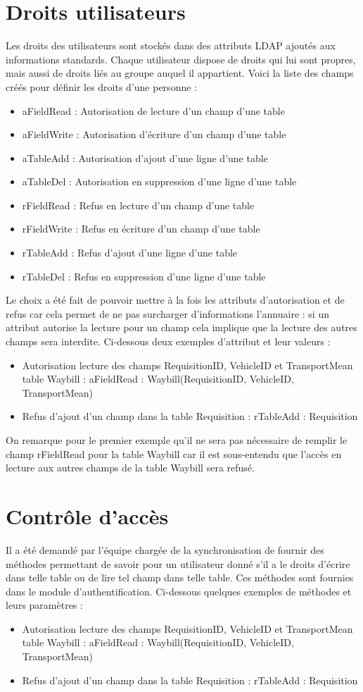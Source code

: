 \documentclass[11pt,fleqn]{report}
\begin{document}
\chapter{Droits utilisateurs}
Les droits des utilisateurs sont stockés dans des attributs LDAP ajoutés aux informations standards. Chaque utilisateur dispose de droits qui lui sont propres, mais aussi de droits liés au groupe auquel il appartient.
Voici la liste des champs créés pour définir les droits d’une personne :
\begin{itemize}
\item aFieldRead : Autorisation de lecture d’un champ d’une table
\item aFieldWrite : Autorisation d’écriture d’un champ d’une table
\item aTableAdd : Autorisation d’ajout d’une ligne d’une table
\item aTableDel : Autorisation en suppression d’une ligne d’une table
\item rFieldRead : Refus en lecture d’un champ d’une table
\item rFieldWrite : Refus en écriture d’un champ d’une table
\item rTableAdd : Refus d’ajout d’une ligne d’une table
\item rTableDel : Refus en suppression d’une ligne d’une table
\end{itemize}
Le choix a été fait de pouvoir mettre à la fois les attributs d’autorisation et de refus car cela permet de ne pas surcharger d’informations l’annuaire : si un attribut autorise la lecture pour un champ cela implique que la lecture des autres champs sera interdite.
Ci-dessous deux exemples d’attribut et leur valeurs :
\begin{itemize}
\item Autorisation lecture des champs RequisitionID, VehicleID et TransportMean table Waybill : 
aFieldRead : Waybill(RequisitionID, VehicleID, TransportMean)
\item Refus d’ajout d’un champ dans la table Requisition : 
rTableAdd : Requisition
\end{itemize}
On remarque pour le premier exemple qu’il ne sera pas nécessaire de remplir le champ rFieldRead pour la table Waybill car il est sous-entendu que l’accès en lecture aux autres champs de la table Waybill sera refusé. 
\chapter{Contrôle d'accès}
Il a été demandé par l’équipe chargée de la synchronisation de fournir des méthodes permettant de savoir pour un utilisateur donné s’il a le droits d’écrire dans telle table ou de lire tel champ dans telle table. Ces méthodes sont fournies dans le module d’authentification. 
Ci-dessous quelques exemples de méthodes et leurs paramètres :
\begin{itemize}
\item Autorisation lecture des champs RequisitionID, VehicleID et TransportMean table Waybill : 
aFieldRead : Waybill(RequisitionID, VehicleID, TransportMean)
\item Refus d’ajout d’un champ dans la table Requisition : 
rTableAdd : Requisition
\end{itemize}
\end{document}
